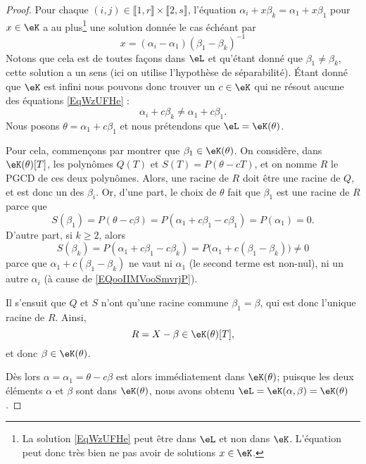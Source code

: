 \begin{proof}
    Pour chaque \( (i,j)\in \llbracket 1,r\rrbracket \times \llbracket 2,s\rrbracket \), l'équation \( \alpha_i+x\beta_k=\alpha_1+x\beta_1\) pour \( x\in \eK\) a au plus\footnote{La solution \eqref{EqWzUFHe} peut être dans \( \eL\) et non dans \( \eK\). L'équation peut donc très bien ne pas avoir de solutions \( x\in \eK\).} une solution donnée le cas échéant par
    \begin{equation}    \label{EqWzUFHe}
        x=(\alpha_i-\alpha_1)(\beta_1-\beta_k)^{-1}
    \end{equation}
    Notons que cela est de toutes façons dans \( \eL\) et qu'étant donné que \( \beta_1\neq \beta_k\), cette solution a un sens (ici on utilise l'hypothèse de séparabilité). Étant donné que \( \eK\) est infini nous pouvons donc trouver un \( c\in \eK\) qui ne résout aucune des équations \eqref{EqWzUFHe} :
    \begin{equation}\label{EQooIIMVooSmvrjP}
        \alpha_i+c\beta_k\neq \alpha_1+c\beta_1.
    \end{equation}
    Nous posons \( \theta=\alpha_1+c\beta_1\) et nous prétendons que \( \eL=\eK(\theta)\).

    Pour cela, commençons par montrer que \( \beta_1 \in \eK(\theta)\). On considère, dans \( \eK(\theta)[T]\), les polynômes \( Q(T)\) et \( S(T)=P(\theta-cT)\), et on nomme \( R\) le PGCD de ces deux polynômes. Alors, une racine de \( R\) doit être une racine de \( Q\), et est donc un des \( \beta_i\). Or, d'une part, le choix de \( \theta\) fait que \( \beta_1\) est une racine de \( R\) parce que
    \begin{equation}
        S(\beta_1)=P(\theta-c\beta)=P(\alpha_1+c\beta_1-c\beta_1)=P(\alpha_1)=0.
    \end{equation}
    D'autre part, si \( k\geq 2\), alors
    \begin{equation}
        S(\beta_k)=P(\alpha_1 + c \beta_1 - c \beta_k) = P\big(\alpha_1 +c(\beta_1-\beta_k)\big)\neq 0
    \end{equation}
    parce que \( \alpha_1 +c(\beta_1 - \beta_k)\) ne vaut ni \( \alpha_1 \) (le second terme est non-nul), ni un autre \( \alpha_i\) (à cause de \eqref{EQooIIMVooSmvrjP}).

    Il s'ensuit que \( Q \) et \(S \) n'ont qu'une racine commune \( \beta_1 = \beta \), qui est donc l'unique racine de \( R\). Ainsi,
    \begin{equation}
        R=X-\beta\in \eK(\theta)[T],
    \end{equation}
    et donc \( \beta\in \eK(\theta)\).

    Dès lors \( \alpha=\alpha_1=\theta-c\beta\) est alors immédiatement dans \( \eK(\theta)\); puisque les deux éléments \( \alpha\) et \( \beta\) sont dans \( \eK(\theta)\), nous avons obtenu \( \eL=\eK(\alpha,\beta)=\eK(\theta)\).

\end{proof}


